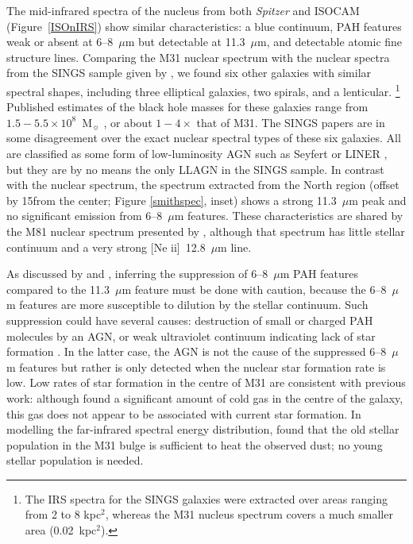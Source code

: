The mid-infrared spectra of the nucleus from both {\em Spitzer} and ISOCAM (Figure~\ref{ISOnIRS}) show similar characteristics: a blue
continuum, PAH features weak or absent at 6--8~$\mu$m  but detectable at 11.3~$\mu$m, and detectable atomic fine structure lines.
Comparing the M31 nuclear spectrum with the nuclear spectra from the SINGS sample given by \citet{Smith:2007lr}, we found
six other galaxies with similar spectral shapes, including three elliptical galaxies, two spirals, and a lenticular.%
\footnote{The IRS spectra for the SINGS galaxies were extracted over areas ranging from 2 to 8 kpc$^2$, whereas the M31
nucleus spectrum covers a much smaller area (0.02~kpc$^2$).}
Published estimates of the black hole masses for these galaxies range from $1.5-5.5\times10^{8}$~M$_{\sun}$
\citep[for NGC~1316 and NGC~4595, respectively]{nowak08, kormendy88}, or about $1-4\times$ that of M31.
The SINGS papers \citep{kennicutt03,Smith:2007lr, moustakas2010} are in some disagreement over the
exact nuclear spectral types of these six galaxies. All are classified as some form of low-luminosity AGN
such as Seyfert or LINER \citep[luminous AGNs were intentionally omitted from the SINGS sample;][]{kennicutt03}, but they are
by no means the only LLAGN in the SINGS sample.
In contrast with the nuclear spectrum, the spectrum extracted from the North region (offset by 15\arcsec from the center; 
Figure \ref{smithspec}, inset) shows a strong 11.3~$\mu$m peak 
and no significant emission from 6--8~$\mu$m features. These characteristics are shared by
the M81 nuclear spectrum presented by \citet{Smith2010}, although that spectrum has little stellar continuum and a very strong [Ne {\sc ii}]~12.8~$\mu$m line. 


As discussed by  \citet{Smith:2007lr} and \citet{Smith2010}, inferring the suppression of 6--8~$\mu$m PAH features compared
to the 11.3~$\mu$m feature must be done with caution, because the 6--8~$\mu$m features are more susceptible to dilution by the stellar
continuum. Such suppression could have several causes: destruction of small or charged PAH molecules by an AGN,
or weak ultraviolet continuum indicating lack of star formation \citep{Smith:2007lr}. In the latter case, the AGN is not the cause of
the suppressed  6--8~$\mu$m features but rather is only detected when the nuclear star formation rate is low.
Low rates of star formation in the centre of M31 are consistent
with previous work: although \citet{Melchior2013} found a significant amount of cold gas in the centre of the galaxy, this gas does not
appear to be associated with current star formation. In modelling the far-infrared spectral energy distribution, \cite{Groves2012} found that  
the old stellar population in the M31 bulge is sufficient  to heat the observed dust; no young stellar population is needed.


